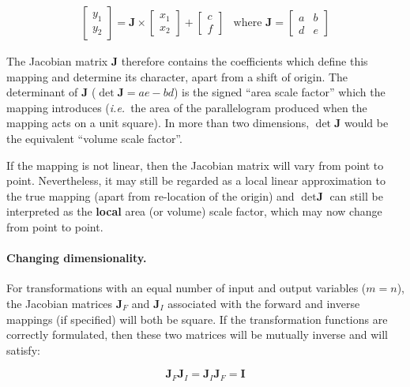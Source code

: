 \documentclass[twoside,11pt]{article}
\begin{document}
\begin{equation}
\begin{array}{cc}
\left[ \begin{array}{c} y_1 \\ y_2 \end{array} \right]
= \mathbf{J} \times \left[ \begin{array}{c} x_1 \\ x_2 \end{array} \right]
+ \left[ \begin{array}{c} c \\ f \end{array} \right]
&
\mbox{where }
\mathbf{J} = \left[ \begin{array}{cc} a & b \\ d & e \end{array} \right]
\end{array}
\end{equation}

The Jacobian matrix $\mathbf{J}$ therefore contains the coefficients which
define this mapping and determine its character, apart from a shift of
origin. 
The determinant of $\mathbf{J}$ (\mbox{\small$\det\mathbf{J}=ae-bd$})
is the signed ``area scale factor'' which the mapping introduces (\emph{i.e.}\
the area of the parallelogram produced when the mapping acts on a unit
square). 
In more than two dimensions, $\det\mathbf{J}$ would be the equivalent ``volume
scale factor''. 

If the mapping is not linear, then the Jacobian matrix will vary from point to
point. 
Nevertheless, it may still be regarded as a local linear approximation to
the true mapping (apart from re-location of the origin) and \mbox{$\det 
\textbf{J}$} can still be interpreted as the \textbf{local} area (or volume) scale
factor, which may now change from point to point. 

\paragraph{Changing dimensionality.}
For transformations with an equal number of input and output variables
(\mbox{$m=n$}), the Jacobian matrices $\textbf{J}_F$ and $\textbf{J}_I$ 
associated
with the forward and inverse mappings (if specified) will both be square. 
If the transformation functions are correctly formulated, then these two
matrices will be mutually inverse and will satisfy: 

\begin{equation}
\textbf{J}_F \textbf{J}_I = \textbf{J}_I \textbf{J}_F = \textbf{I}
\end{equation}
\end{document}
